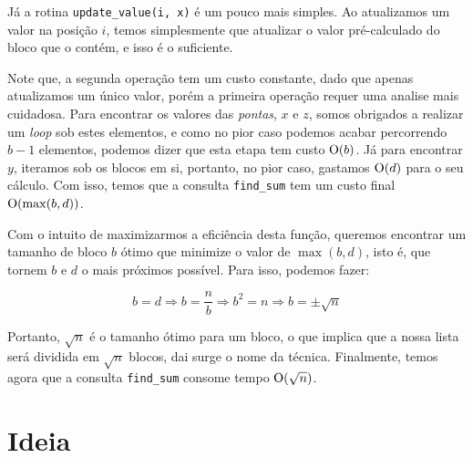 Já a rotina \texttt{update\_value(i, x)} é um pouco mais simples. Ao atualizamos um valor na posição $i$, temos simplesmente que atualizar o valor pré-calculado do bloco que o contém, e isso é o suficiente.

Note que, a segunda operação tem um custo constante, dado que apenas atualizamos um único valor, porém a primeira operação requer uma analise mais cuidadosa. Para encontrar os valores das \emph{pontas}, $x$ e $z$, somos obrigados a realizar um \emph{loop} sob estes elementos, e como no pior caso podemos acabar percorrendo $b-1$ elementos, podemos dizer que esta etapa tem custo $\mathrm{O}(b)$. Já para encontrar $y$, iteramos sob os blocos em si, portanto, no pior caso, gastamos $\mathrm{O}(d)$ para o seu cálculo. Com isso, temos que a consulta \texttt{find\_sum} tem um custo final $\mathrm{O}(\max(b, d))$.

Com o intuito de maximizarmos a eficiência desta função, queremos encontrar um tamanho de bloco $b$ ótimo que minimize o valor de $\max(b, d)$, isto é, que tornem $b$ e $d$ o mais próximos possível. Para isso, podemos fazer:

\begin{equation}
    b = d \Rightarrow
    b = \frac{n}{b} \Rightarrow
    b^2 = n \Rightarrow
    b = \pm \sqrt{n}
\end{equation}

Portanto, $\sqrt{n}$ é o tamanho ótimo para um bloco, o que implica que a nossa lista será dividida em $\sqrt{n}$ blocos, dai surge o nome da técnica. Finalmente, temos agora que a consulta \texttt{find\_sum} consome tempo $\mathrm{O}(\sqrt{n})$.


\section{Ideia}
\label{sec:rmsf-ideia}




